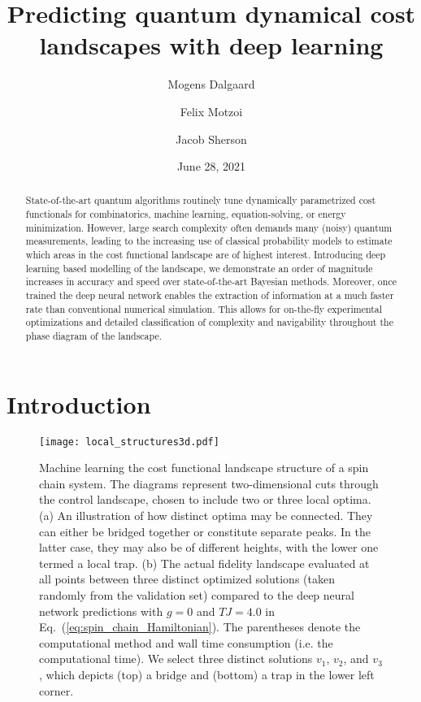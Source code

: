 \documentclass[aps, twocolumn,superscriptaddress]{revtex4-1}
\begin{document}
\title{Predicting quantum dynamical cost landscapes with deep learning}


\author{Mogens Dalgaard}

\author{Felix Motzoi}

\author{Jacob Sherson}

\date{June 28, 2021}

\begin{abstract}
State-of-the-art quantum algorithms routinely tune dynamically parametrized cost functionals for combinatorics, machine learning, equation-solving, or energy minimization. However, large search complexity often demands many (noisy) quantum measurements, leading to the increasing use of classical probability models to estimate which areas in the cost functional landscape are of highest interest. Introducing deep learning based modelling of the landscape, we demonstrate an order of magnitude increases in accuracy and speed over state-of-the-art Bayesian methods. Moreover, once trained the deep neural network enables the extraction of information at a much faster rate than conventional numerical simulation. This allows for on-the-fly experimental optimizations and detailed classification of complexity and navigability throughout the phase diagram of the landscape. 
 
\end{abstract}


\maketitle
\section{Introduction}

\begin{figure*}
    \centering
    \texttt{[image: local\_structures3d.pdf]}
    \caption{Machine learning the cost functional landscape structure of a spin chain system. The diagrams represent two-dimensional cuts through the control landscape, chosen to include two or three local optima. (a) An illustration of how distinct optima may be connected. They can either be bridged together or constitute separate peaks. In the latter case, they may also be of different heights, with the lower one termed a local trap. (b) The actual fidelity landscape evaluated at all points between three distinct optimized solutions (taken randomly from the validation set) compared to the deep neural network predictions with $g=0$ and $TJ = 4.0$ in Eq.~(\ref{eq:spin_chain_Hamiltonian}). The parentheses denote the computational method and wall time consumption (i.e. the computational time). We select three distinct solutions $v_1$, $v_2$, and $v_3$, which depicts (top) a bridge and (bottom) a trap in the lower left corner.}
    \label{fig:local structure}
\end{figure*}
\end{document}
